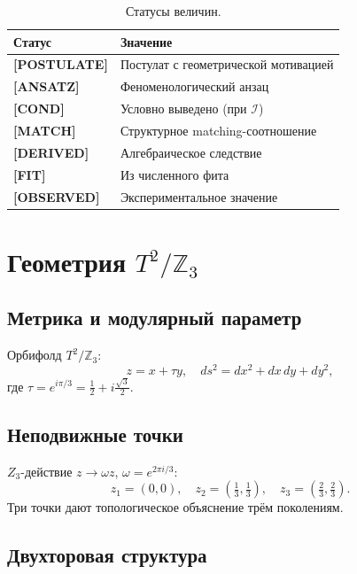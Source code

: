 \documentclass[12pt,a4paper]{article}
\numberwithin{equation}{section}
\begin{document}
\begin{table}[H]
\centering
\caption{Статусы величин.}
\begin{tabular}{ll}
\toprule
Статус & Значение \\
\midrule
\textbf{[POSTULATE]} & Постулат с геометрической мотивацией \\
\textbf{[ANSATZ]}    & Феноменологический анзац \\
\textbf{[COND]}      & Условно выведено (при $\mathcal{I}$) \\
\textbf{[MATCH]}     & Структурное matching-соотношение \\
\textbf{[DERIVED]}   & Алгебраическое следствие \\
\textbf{[FIT]}       & Из численного фита \\
\textbf{[OBSERVED]}  & Экспериментальное значение \\
\bottomrule
\end{tabular}
\end{table}

\section{Геометрия $T^2/\mathbb{Z}_3$}
\label{sec:geom}

\subsection{Метрика и модулярный параметр}

Орбифолд $T^2/\mathbb{Z}_3$:
\begin{equation}
z = x + \tau y, \quad ds^2 = dx^2 + dx\,dy + dy^2,
\end{equation}
где $\tau = e^{i\pi/3} = \frac12 + i\frac{\sqrt3}{2}$.

\subsection{Неподвижные точки}

$Z_3$-действие $z \to \omega z$, $\omega = e^{2\pi i/3}$:
\begin{equation}
z_1 = (0,0), \quad z_2 = (\tfrac13,\tfrac13), \quad z_3 = (\tfrac23,\tfrac23).
\end{equation}
Три точки дают топологическое объяснение трём поколениям.

\subsection{Двухторовая структура}
\label{sec:tau-fit}
\end{document}
